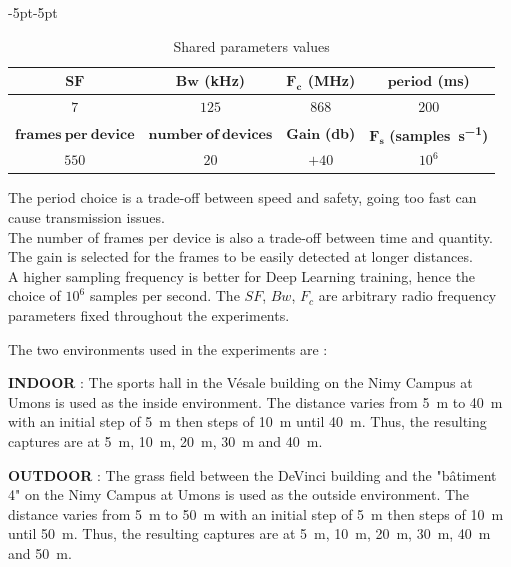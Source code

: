 \documentclass[a4paper, 12pt]{article}
\begin{document}
\begin{table}[ht]
  \caption{Shared parameters values}\label{tab:sharedParams}
  \begin{adjustwidth}{-5pt}{-5pt} %
  \centering
  \begin{tabular}{|c|c|c|c|}
   \hline 
   $\mathbf{SF}$ & $\mathbf{Bw}$ \textbf{(\unit{\kilo\hertz})} & $\mathbf{F_c}$ \textbf{(\unit{\mega\hertz})} & $\mathbf{period}$ \textbf{(\unit{\ms})} \\
   \hline 
   $7$ & $125$ & $868$ & $200$ \\
   \hline 
   $\mathbf{frames}\ \mathbf{per}\ \mathbf{device}$ & $\mathbf{number}\ \mathbf{of}\ \mathbf{devices}$ & $\mathbf{Gain}$ \textbf{(\unit{\decibel})} & $\mathbf{F_s}$ \textbf{(\unit{samples\per\s})} \\
   \hline 
   $550$ & $20$ & $+40$ & $10^6$ \\
   \hline 
  \end{tabular}
  \end{adjustwidth}
\end{table}

The period choice is a trade-off between speed and safety, going too fast can cause transmission issues.\\
The number of frames per device is also a trade-off between time and quantity.\\
The gain is selected for the frames to be easily detected at longer distances. \\
A higher sampling frequency is better for Deep Learning training, hence the choice of $10^6$ samples per second.
The $SF$, $Bw$, $F_c$ are arbitrary radio frequency parameters fixed throughout the experiments.

The two environments used in the experiments are :

\textbf{INDOOR} : The sports hall in the Vésale building on the Nimy Campus at Umons is used as the inside environment.
The distance varies from \qty{5}{\m} to \qty{40}{\m} with an initial step of \qty{5}{\m} then steps of \qty{10}{\m} until \qty{40}{\m}.
Thus, the resulting captures are at \qty{5}{\m}, \qty{10}{\m}, \qty{20}{\m}, \qty{30}{\m} and \qty{40}{\m}.

\textbf{OUTDOOR} : The grass field between the DeVinci building and the "bâtiment 4" on the Nimy Campus at Umons is used as the outside environment. 
The distance varies from \qty{5}{\m} to \qty{50}{\m} with an initial step of \qty{5}{\m} then steps of \qty{10}{\m} until \qty{50}{\m}.
Thus, the resulting captures are at \qty{5}{\m}, \qty{10}{\m}, \qty{20}{\m}, \qty{30}{\m}, \qty{40}{\m} and \qty{50}{\m}.
\end{document}
